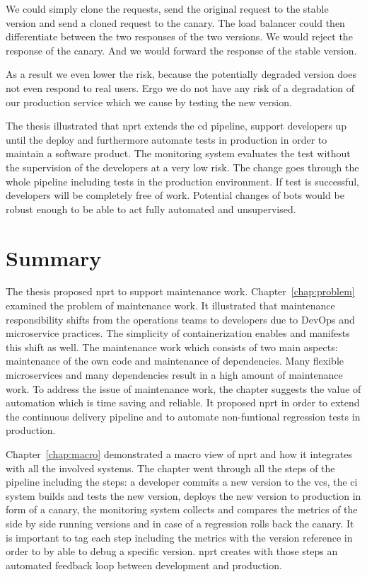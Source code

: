 We could simply clone the requests, send the original request to the stable version and
send a cloned request to the canary. The load balancer could then differentiate between the
two responses of the two versions. We would reject the response of the canary. And we
would forward the response of the stable version.

As a result we even lower the risk, because the potentially degraded version does not even
respond to real users. Ergo we do not have any risk of a degradation of our production
service which we cause by testing the new version.


The thesis illustrated that \gls{nprt} extends the \gls{cd} pipeline, support developers
up until the deploy and furthermore automate tests in production in order to maintain a
software product. The monitoring system evaluates the test without the supervision of the
developers at a very low risk. The change goes through the whole pipeline including tests
in the production environment. If test is successful, developers will be completely free
of work. Potential changes of bots would be robust enough to be able to act fully
automated and unsupervised.

\section{Summary}

The thesis proposed \gls{nprt} to support maintenance work. Chapter~\ref{chap:problem}
examined the problem of maintenance work. It illustrated that maintenance responsibility
shifts from the operations teams to developers due to DevOps and microservice
practices. The simplicity of containerization enables and manifests this shift as
well. The maintenance work which consists of two main aspects: maintenance of the own code
and maintenance of dependencies. Many flexible microservices and many dependencies result
in a high amount of maintenance work. To address the issue of maintenance work, the
chapter suggests the value of automation which is time saving and reliable. It proposed
\gls{nprt} in order to extend the continuous delivery pipeline and to automate
non-funtional regression tests in production.

Chapter~\ref{chap:macro} demonstrated a macro view of \gls{nprt} and how it integrates
with all the involved systems. The chapter went through all the steps of the pipeline
including the steps: a developer commits a new version to the \gls{vcs}, the \gls{ci}
system builds and tests the new version, \deployer deploys the new version to production
in form of a canary, the monitoring system collects and compares the metrics of the side
by side running versions and in case of a regression \deployer rolls back the canary. It
is important to tag each step including the metrics with the version reference in order to
by able to debug a specific version. \gls{nprt} creates with those steps an automated
feedback loop between development and production.

